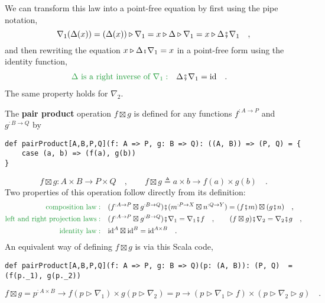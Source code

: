 We can transform this law into a point-free equation by first using
the pipe notation,
\[
\nabla_{1}(\Delta(x))=(\Delta(x))\triangleright\nabla_{1}=x\triangleright\Delta\triangleright\nabla_{1}=x\triangleright\Delta\bef\nabla_{1}\quad,
\]
and then rewriting the equation $x\triangleright\Delta\bef\nabla_{1}=x$
in a point-free form using the identity function, 
\begin{align}
{\color{greenunder}\Delta\text{ is a right inverse of }\nabla_{1}:}\quad & \Delta\bef\nabla_{1}=\text{id}\quad.\label{eq:pair-identity-law-left}
\end{align}
The same property holds for $\nabla_{2}$.

The \textbf{pair product} operation
$f\boxtimes g$ is defined for any functions $f^{:A\rightarrow P}$
and $g^{:B\rightarrow Q}$ by
\begin{lstlisting}
def pairProduct[A,B,P,Q](f: A => P, g: B => Q): ((A, B)) => (P, Q) = {
    case (a, b) => (f(a), g(b))
}
\end{lstlisting}
\[
f\boxtimes g:A\times B\rightarrow P\times Q\quad,\quad\quad f\boxtimes g\triangleq a\times b\rightarrow f(a)\times g(b)\quad.
\]
Two properties of this operation follow directly from its definition:
\begin{align}
{\color{greenunder}\text{composition law}:}\quad & (f^{:A\rightarrow P}\boxtimes g^{:B\rightarrow Q})\bef(m^{:P\rightarrow X}\boxtimes n^{:Q\rightarrow Y})=(f\bef m)\boxtimes(g\bef n)\quad,\label{eq:pair-product-composition-law}\\
{\color{greenunder}\text{left and right projection laws}:}\quad & (f^{:A\rightarrow P}\boxtimes g^{:B\rightarrow Q})\bef\nabla_{1}=\nabla_{1}\bef f\quad,\quad\quad(f\boxtimes g)\bef\nabla_{2}=\nabla_{2}\bef g\quad,\label{eq:pair-product-projection-laws}\\
{\color{greenunder}\text{identity law}:}\quad & \text{id}^{A}\boxtimes\text{id}^{B}=\text{id}^{A\times B}\quad.\nonumber 
\end{align}
An equivalent way of defining $f\boxtimes g$ is via this Scala code,
\begin{lstlisting}
def pairProduct[A,B,P,Q](f: A => P, g: B => Q)(p: (A, B)): (P, Q)  =  (f(p._1), g(p._2))
\end{lstlisting}
\[
f\boxtimes g=p^{:A\times B}\rightarrow f(p\triangleright\nabla_{1})\times g(p\triangleright\nabla_{2})=p\rightarrow(p\triangleright\nabla_{1}\triangleright f)\times(p\triangleright\nabla_{2}\triangleright g)\quad.
\]

